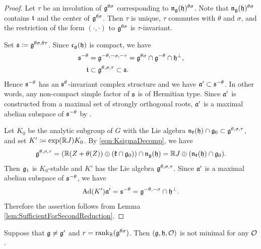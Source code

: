 \begin{proof}
	Let $\tau$ be an involution of $\mathfrak{g}^{\theta\sigma}$ corresponding to $\mathfrak{n}_{\mathfrak{g}}(\mathfrak{h})^{\theta\sigma}$.
	Note that $\mathfrak{n}_{\mathfrak{g}}(\mathfrak{h})^{\theta\sigma}$ contains $\mathfrak{t}$ and the center of $\mathfrak{g}^{\theta\sigma}$.
	Then $\tau$ is unique, $\tau$ commutes with $\theta$ and $\sigma$, and the restriction of the form $(\cdot, \cdot)$ to $\mathfrak{g}^{\theta\sigma}$ is $\tau$-invariant.

	Set $\mathfrak{s} \coloneq \mathfrak{g}^{\theta\sigma, \theta\tau}$.
	Since $\mathfrak{c}_{\mathfrak{g}}(\mathfrak{h})$ is compact, we have
	\begin{align*}
		\mathfrak{s}^{-\theta} &= \mathfrak{g}^{-\theta, -\sigma, -\tau} = \mathfrak{g}^{\theta\sigma} \cap \mathfrak{g}^{-\theta} \cap \mathfrak{h}^\perp, \\
		\mathfrak{t}&\subset \mathfrak{g}^{\theta, \sigma, \tau} \subset \mathfrak{s}.
	\end{align*}
	Hence $\mathfrak{s}^{-\theta}$ has an $\mathfrak{s}^{\theta}$-invariant complex structure and we have $\mathfrak{a}' \subset \mathfrak{s}^{-\theta}$.
	In other words, any non-compact simple factor of $\mathfrak{s}$ is of Hermitian type.
	Since $\mathfrak{a'}$ is constructed from a maximal set of strongly orthogonal roots, $\mathfrak{a'}$ is a maximal abelian subspace of $\mathfrak{s}^{-\theta}$ by \cite[Lemma 7.143]{Kn02}.

	Let $K_0$ be the analytic subgroup of $G$ with the Lie algebra $\mathfrak{n}_{\mathfrak{k}}(\mathfrak{h})\cap \mathfrak{g}_0 \subset \mathfrak{g}^{\theta, \sigma, \tau}$, and set $K'\coloneq \exp(\mathbb{R} J)K_0$.
	By \eqref{eqn:KsigmaDecomp}, we have
	\begin{align*}
		\mathfrak{g}^{\theta, \sigma, \tau} = (\mathbb{R} (Z+\theta(Z)) \oplus (\mathfrak{k}\cap \mathfrak{g}_0)) \cap \mathfrak{n}_{\mathfrak{g}}(\mathfrak{h})
		= \mathbb{R} J \oplus (\mathfrak{n}_{\mathfrak{k}}(\mathfrak{h})\cap \mathfrak{g}_0).
	\end{align*}
	Then $\mathfrak{g}_1$ is $K_0$-stable and $K'$ has the Lie algebra $\mathfrak{g}^{\theta, \sigma, \tau}$.
	Since $\mathfrak{a'}$ is a maximal abelian subspace of $\mathfrak{s}^{-\theta}$, we have
	\begin{align*}
		\mathrm{Ad}(K')\mathfrak{a'} = \mathfrak{s}^{-\theta} = \mathfrak{g}^{-\theta, -\sigma} \cap \mathfrak{h}^\perp.
	\end{align*}
	Therefore the assertion follows from Lemma \ref{lem:SufficientForSecondReduction}.
\end{proof}

\begin{proposition} \label{prop:NonMinimalFullRank}
	Suppose that $\mathfrak{g} \neq \mathfrak{g'}$ and $r = \operatorname{rank}_{\mathbb{R}}(\mathfrak{g}^{\theta\sigma})$.
	Then $(\mathfrak{g}, \mathfrak{h}, \mathcal{O})$ is not minimal for any $\mathcal{O}$.
\end{proposition}

